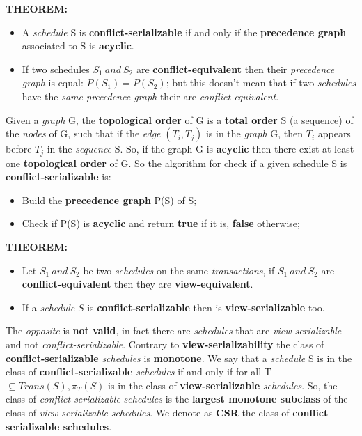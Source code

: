 \documentclass{article}
\begin{document}
\textbf{THEOREM:}
\begin{itemize}
\item A \emph{schedule} S is \textbf{conflict-serializable} if and only if the \textbf{precedence graph} associated to S is \textbf{acyclic}. 
\item If two schedules $S_1\ and\ S_2$ are \textbf{conflict-equivalent} then their \emph{precedence graph} is equal: $P(S_1) = P(S_2)$; but this doesn't mean that if two \emph{schedules} have the \emph{same precedence graph} their are \emph{conflict-equivalent}.
\end{itemize}
Given a \emph{graph} G, the \textbf{topological order} of G is a \textbf{total order} S (a sequence) of the \emph{nodes} of G, such that if the \emph{edge} $(T_i , T_j)$ is in the \emph{graph} G, then $T_i$ appears before $T_j$ in the \emph{sequence} S. So, if the graph G is \textbf{acyclic} then there exist at least one \textbf{topological order} of G. So the algorithm for check if a given schedule S is \textbf{conflict-serializable} is:
\begin{itemize}
\item Build the \textbf{precedence graph} P(S) of S;
\item Check if P(S) is \textbf{acyclic} and return \textbf{true} if it is, \textbf{false} otherwise;
\end{itemize}
\textbf{THEOREM:}
\begin{itemize}
\item Let $S_1\ and\ S_2$ be two \emph{schedules} on the same \emph{transactions}, if $S_1\ and\ S_2$ are \textbf{conflict-equivalent} then they are \textbf{view-equivalent}.
\item If a \emph{schedule} $S$ is \textbf{conflict-serializable} then is \textbf{view-serializable} too.
\end{itemize}
The \emph{opposite} is \textbf{not valid}, in fact there are \emph{schedules} that are \emph{view-serializable} and not \emph{conflict-serializable}. Contrary to \textbf{view-serializability} the class of \textbf{conflict-serializable} \emph{schedules} is \textbf{monotone}. We say that a \emph{schedule} S is in the class of \textbf{conflict-serializable} \emph{schedules} if and only if for all T $\subseteq Trans(S), \pi_{T}(S)$ is in the class of \textbf{view-serializable} \emph{schedules}. So, the class of \emph{conflict-serializable} \emph{schedules} is the \textbf{largest monotone subclass} of the class of \emph{view-serializable} \emph{schedules}. We denote as \textbf{CSR} the class of \textbf{conflict serializable schedules}. \\\\
\end{document}
